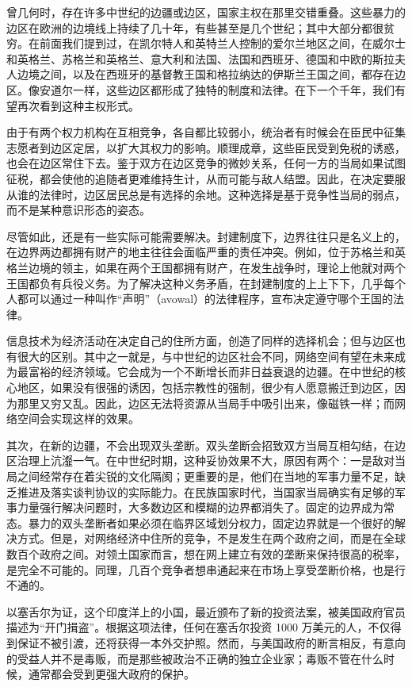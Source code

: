 曾几何时，存在许多中世纪的边疆或边区，国家主权在那里交错重叠。这些暴力的边区在欧洲的边境线上持续了几十年，有些甚至是几个世纪；其中大部分都很贫穷。在前面我们提到过，在凯尔特人和英特兰人控制的爱尔兰地区之间，在威尔士和英格兰、苏格兰和英格兰、意大利和法国、法国和西班牙、德国和中欧的斯拉夫人边境之间，以及在西班牙的基督教王国和格拉纳达的伊斯兰王国之间，都存在边区。像安道尔一样，这些边区都形成了独特的制度和法律。在下一个千年，我们有望再次看到这种主权形式。

由于有两个权力机构在互相竞争，各自都比较弱小，统治者有时候会在臣民中征集志愿者到边区定居，以扩大其权力的影响。顺理成章，这些臣民受到免税的诱惑，也会在边区常住下去。鉴于双方在边区竞争的微妙关系，任何一方的当局如果试图征税，都会使他的追随者更难维持生计，从而可能与敌人结盟。因此，在决定要服从谁的法律时，边区居民总是有选择的余地。这种选择是基于竞争性当局的弱点，而不是某种意识形态的姿态。

尽管如此，还是有一些实际可能需要解决。封建制度下，边界往往只是名义上的，在边界两边都拥有财产的地主往往会面临严重的责任冲突。例如，位于苏格兰和英格兰边境的领主，如果在两个王国都拥有财产，在发生战争时，理论上他就对两个王国都负有兵役义务。为了解决这种义务矛盾，在封建制度的上上下下，几乎每个人都可以通过一种叫作“声明”（avowal）的法律程序，宣布决定遵守哪个王国的法律。

信息技术为经济活动在决定自己的住所方面，创造了同样的选择机会；但与边区也有很大的区别。其中之一就是，与中世纪的边区社会不同，网络空间有望在未来成为最富裕的经济领域。它会成为一个不断增长而非日益衰退的边疆。在中世纪的核心地区，如果没有很强的诱因，包括宗教性的强制，很少有人愿意搬迁到边区，因为那里又穷又乱。因此，边区无法将资源从当局手中吸引出来，像磁铁一样；而网络空间会实现这样的效果。

其次，在新的边疆，不会出现双头垄断。双头垄断会招致双方当局互相勾结，在边区治理上沆瀣一气。在中世纪时期，这种妥协效果不大，原因有两个：一是敌对当局之间经常存在着尖锐的文化隔阂；更重要的是，他们在当地的军事力量不足，缺乏推进及落实谈判协议的实际能力。在民族国家时代，当国家当局确实有足够的军事力量强行解决问题时，大多数边区和模糊的边界都消失了。固定的边界成为常态。暴力的双头垄断者如果必须在临界区域划分权力，固定边界就是一个很好的解决方式。但是，对网络经济中住所的竞争，不是发生在两个政府之间，而是在全球数百个政府之间。对领土国家而言，想在网上建立有效的垄断来保持很高的税率，是完全不可能的。同理，几百个竞争者想串通起来在市场上享受垄断价格，也是行不通的。

以塞舌尔为证，这个印度洋上的小国，最近颁布了新的投资法案，被美国政府官员描述为“开门揖盗”。根据这项法律，任何在塞舌尔投资 1000 万美元的人，不仅得到保证不被引渡，还将获得一本外交护照。然而，与美国政府的断言相反，有意向的受益人并不是毒贩，而是那些被政治不正确的独立企业家；毒贩不管在什么时候，通常都会受到更强大政府的保护。

